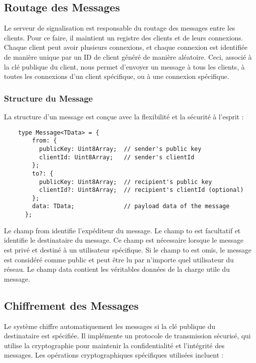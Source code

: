 \subsection{Routage des Messages}

Le serveur de signalisation est responsable du routage des messages entre les clients. Pour ce faire, il maintient un registre des clients et de leurs connexions. Chaque client peut avoir plusieurs connexions, et chaque connexion est identifiée de manière unique par un ID de client généré de manière aléatoire. Ceci, associé à la clé publique du client, nous permet d'envoyer un message à tous les clients, à toutes les connexions d'un client spécifique, ou à une connexion spécifique.

\subsubsection{Structure du Message}

La structure d'un message est conçue avec la flexibilité et la sécurité à l'esprit :

\begin{verbatim}
    type Message<TData> = {
        from: {
          publicKey: Uint8Array;  // sender's public key
          clientId: Uint8Array;   // sender's clientId
        };
        to?: {
          publicKey: Uint8Array;  // recipient's public key
          clientId?: Uint8Array;  // recipient's clientId (optional)
        };
        data: TData;              // payload data of the message
      };
\end{verbatim}

Le champ from identifie l'expéditeur du message.
Le champ to est facultatif et identifie le destinataire du message. Ce champ est nécessaire lorsque le message est privé et destiné à un utilisateur spécifique. Si le champ to est omis, le message est considéré comme public et peut être lu par n'importe quel utilisateur du réseau.
Le champ data contient les véritables données de la charge utile du message.

\subsection{Chiffrement des Messages}

Le système chiffre automatiquement les messages si la clé publique du destinataire est spécifiée. Il implémente un protocole de transmission sécurisé, qui utilise la cryptographie pour maintenir la confidentialité et l'intégrité des messages. Les opérations cryptographiques spécifiques utilisées incluent :

